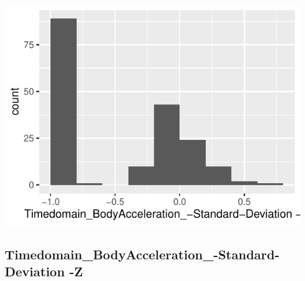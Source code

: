 \documentclass[
]{article}
\begin{document}
\begin{minipage}{0.25 \textwidth}

\includegraphics{codebook_tidydatasub_files/figure-latex/Var-7-Timedomain-BodyAcceleration--Standard-Deviation--Y-1.pdf}

\end{minipage}

\noindent\makebox[\linewidth]{\rule{\textwidth}{0.4pt}}

\hypertarget{timedomain_bodyacceleration_-standard-deviation--z}{%
\subsection{Timedomain\_BodyAcceleration\_-Standard-Deviation
-Z}\label{timedomain_bodyacceleration_-standard-deviation--z}}
\end{document}
